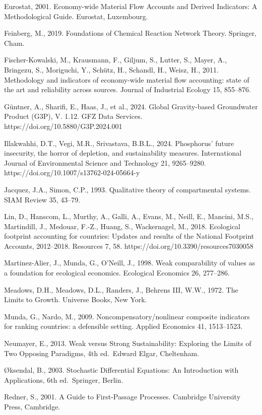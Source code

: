 \documentclass[11pt]{article}
\begin{document}
Eurostat, 2001. Economy-wide Material Flow Accounts and Derived
Indicators: A Methodological Guide. Eurostat, Luxembourg.

Feinberg, M., 2019. Foundations of Chemical Reaction Network Theory.
Springer, Cham.

Fischer-Kowalski, M., Krausmann, F., Giljum, S., Lutter, S., Mayer, A.,
Bringezu, S., Moriguchi, Y., Sch\"utz, H., Schandl, H., Weisz, H., 2011.
Methodology and indicators of economy-wide material flow accounting:
state of the art and reliability across sources. Journal of Industrial
Ecology 15, 855--876.

G\"untner, A., Sharifi, E., Haas, J., et al., 2024. Global Gravity-based
Groundwater Product (G3P), V. 1.12. GFZ Data Services.
https://doi.org/10.5880/G3P.2024.001

Illakwahhi, D.T., Vegi, M.R., Srivastava, B.B.L., 2024. Phosphorus'
future insecurity, the horror of depletion, and sustainability measures.
International Journal of Environmental Science and Technology 21,
9265--9280. https://doi.org/10.1007/s13762-024-05664-y

Jacquez, J.A., Simon, C.P., 1993. Qualitative theory of compartmental
systems. SIAM Review 35, 43--79.

Lin, D., Hanscom, L., Murthy, A., Galli, A., Evans, M., Neill, E.,
Mancini, M.S., Martindill, J., Medouar, F.-Z., Huang, S., Wackernagel,
M., 2018. Ecological footprint accounting for countries: Updates and
results of the National Footprint Accounts, 2012--2018. Resources 7, 58.
https://doi.org/10.3390/resources7030058

Martinez-Alier, J., Munda, G., O'Neill, J., 1998. Weak comparability of
values as a foundation for ecological economics. Ecological Economics
26, 277--286.

Meadows, D.H., Meadows, D.L., Randers, J., Behrens III, W.W., 1972. The
Limits to Growth. Universe Books, New York.

Munda, G., Nardo, M., 2009. Noncompensatory/nonlinear composite
indicators for ranking countries: a defensible setting. Applied
Economics 41, 1513--1523.

Neumayer, E., 2013. Weak versus Strong Sustainability: Exploring the
Limits of Two Opposing Paradigms, 4th ed.~Edward Elgar, Cheltenham.

\O{}ksendal, B., 2003. Stochastic Differential Equations: An Introduction
with Applications, 6th ed.~Springer, Berlin.

Redner, S., 2001. A Guide to First-Passage Processes. Cambridge
University Press, Cambridge.
\end{document}
